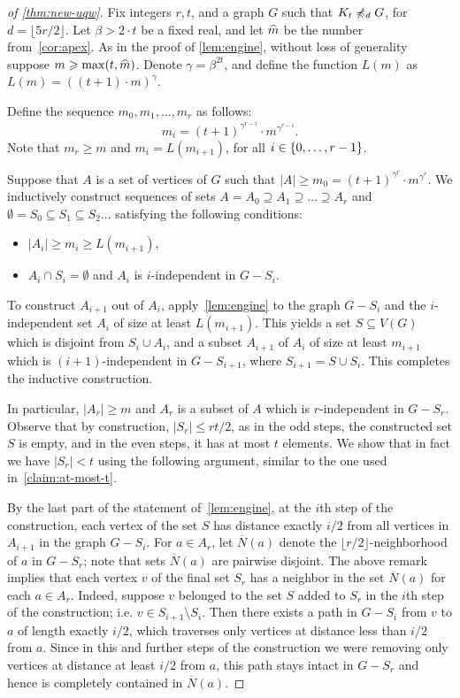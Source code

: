 \begin{proof}[of \cref{thm:new-uqw}]
Fix integers $r,t$,  and a graph $G$ such that $K_t\not\preccurlyeq_{d} G$,
for $d=\lfloor 5r/2 \rfloor$. Let $\beta>2\cdot t$ be a fixed real, and let $\widehat{m}$ be the number from~\cref{cor:apex}. As in the proof of \cref{lem:engine}, without loss of generality suppose $m\geqslant \max(t,\widehat{m})$.
 Denote $\gamma=\beta^{2t}$, and
define the function $L(m)$ as $L(m)=((t+1)\cdot m)^\gamma$.

Define the sequence $m_0,m_1,\ldots,m_r$ as follows:
$$m_i=(t+1)^{\gamma^{r-i}}\cdot m^{\gamma^{r-i}}.$$ 
Note that $m_r\geq m$ and $m_i=L(m_{i+1})$, for all $i\in \{0,\ldots,r-1\}$.

Suppose that $A$ is a set of vertices of $G$ such that $|A|\ge m_0=(t+1)^{\gamma^{r}}\cdot m^{\gamma^{r}}$. 
We inductively construct sequences of sets $A= A_0\supseteq A_1\supseteq \ldots \supseteq A_r$ and $\emptyset=S_0\subseteq S_1\subseteq S_2\ldots$
satisfying the following conditions:
\begin{itemize}
	\item $|A_i|\ge m_i \ge L(m_{i+1})$,
	\item $A_i\cap S_i=\emptyset$ and $A_i$ is $i$-independent in $G-S_i$.
\end{itemize}
To construct $A_{i+1}$ out of $A_i$, apply~\cref{lem:engine} to the graph $G-S_i$ and 
the $i$-independent set $A_i$ of size at least $L(m_{i+1})$. This yields a set $S\subseteq V(G)$ which is disjoint from $S_i\cup A_i$, and a subset $A_{i+1}$ of $A_i$ of size 
at least $m_{i+1}$
which is $(i+1)$-independent in $G-S_{i+1}$, where $S_{i+1}=S\cup S_i$. This completes the inductive construction.

In particular,  $|A_r|\ge m$ and $A_r$ is a subset of $A$ which is $r$-independent in $G-S_r$.
Observe that by construction, $|S_r|\le r t/2$, as in the odd steps, the constructed set $S$ is empty, and in the even steps, it has at most $t$ elements. 
We show that in fact we have $|S_r|<t$ using the following argument, similar to the one used in~\cref{claim:at-most-t}.


By the last part of the statement of~\cref{lem:engine},  at the $i$th step of the construction, each vertex of the set $S$
has distance exactly $i/2$ from all vertices in $A_{i+1}$ in the graph 
$G-S_i$. 
For $a\in A_r$, let $\overline{N}(a)$ denote the $\lfloor r/2\rfloor$-neighborhood of $a$ in $G-S_r$; note that sets $\overline{N}(a)$ are pairwise disjoint.
The above remark implies that each vertex $v$ of the final set $S_r$ has a neighbor in the set $\overline{N}(a)$ for each $a\in A_r$.
Indeed, suppose $v$ belonged to the set $S$ added to $S_r$ in the $i$th step of the construction; i.e. $v\in S_{i+1}\setminus S_i$.
Then there exists a path in $G-S_i$ from $v$ to $a$ of length exactly $i/2$, which traverses only vertices at distance less than $i/2$ from $a$.
Since in this and further steps of the construction we were removing only vertices at distance at least $i/2$ from $a$, this path stays intact in $G-S_r$ and hence is completely contained in $\overline{N}(a)$.


\end{proof}
